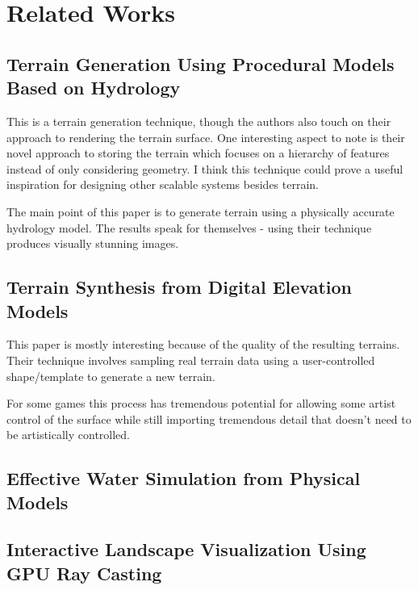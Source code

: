 
\chapter{Related Works} \label{rworks}



\section{Terrain Generation Using Procedural Models Based on Hydrology}

This is a terrain generation technique, though the authors also touch on their approach to rendering the terrain surface.
One interesting aspect to note is their novel approach to storing the terrain which focuses on a hierarchy of features instead of only considering geometry.
I think this technique could prove a useful inspiration for designing other scalable systems besides terrain.

The main point of this paper is to generate terrain using a physically accurate hydrology model.
The results speak for themselves - using their technique produces visually stunning images.


\section{Terrain Synthesis from Digital Elevation Models}

This paper is mostly interesting because of the quality of the resulting terrains.
Their technique involves sampling real terrain data using a user-controlled shape/template to generate a new terrain.

For some games this process has tremendous potential for allowing some artist control of the surface while still importing tremendous detail that doesn't need to be artistically controlled.


\section{Effective Water Simulation from Physical Models}


\section{Interactive Landscape Visualization Using GPU Ray Casting}


